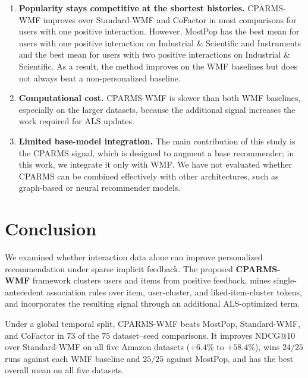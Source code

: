 \documentclass[pdflatex,sn-vancouver-num]{sn-jnl}%
\theoremstyle{thmstyleone}%
\theoremstyle{thmstyletwo}%
\theoremstyle{thmstylethree}%
\begin{document}
\begin{enumerate}
\item \textbf{Popularity stays competitive at the shortest histories.} CPARMS-WMF improves over Standard-WMF and CoFactor in most comparisons for users with one positive interaction. However, MostPop has the best mean for users with one positive interaction on Industrial \& Scientific and Instruments and the best mean for users with two positive interactions on Industrial \& Scientific. As a result, the method improves on the WMF baselines but does not always beat a non-personalized baseline.

\item \textbf{Computational cost.} CPARMS-WMF is slower than both WMF baselines, especially on the larger datasets, because the additional signal increases the work required for ALS updates.

\item \textbf{Limited base-model integration.} The main contribution of this study is the CPARMS signal, which is designed to augment a base recommender; in this work, we integrate it only with WMF. We have not evaluated whether CPARMS can be combined effectively with other architectures, such as graph-based or neural recommender models.

\end{enumerate}



\section{Conclusion}\label{sec7}

We examined whether interaction data alone can improve personalized recommendation under sparse implicit feedback. The proposed \textbf{CPARMS-WMF} framework clusters users and items from positive feedback, mines single-antecedent association rules over item, user-cluster, and liked-item-cluster tokens, and incorporates the resulting signal through an additional ALS-optimized term.

Under a global temporal split, CPARMS-WMF beats MostPop, Standard-WMF, and CoFactor in $73$ of the $75$ dataset--seed comparisons. It improves NDCG@10 over Standard-WMF on all five Amazon datasets ($+6.4\%$ to $+58.4\%$), wins $24/25$ runs against each WMF baseline and $25/25$ against MostPop, and has the best overall mean on all five datasets.
\end{document}
